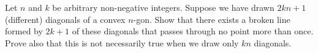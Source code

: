 Let $n$ and $k$ be arbitrary non-negative integers. Suppose we have drawn $2kn+1$ (different) diagonals of a convex $n$-gon. Show that there exists a broken line formed by $2k+1$ of these diagonals that passes through no point more than once. Prove also that this is not necessarily true when we draw only $kn$ diagonals.